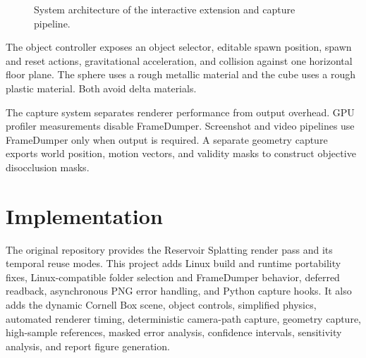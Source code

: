 \documentclass[10pt,twocolumn]{article}
\begin{document}
\begin{figure}[t]
\centering
{}
\caption{System architecture of the interactive extension and capture
pipeline.}
\label{fig:architecture}
\end{figure}

The object controller exposes an object selector, editable spawn position,
spawn and reset actions, gravitational acceleration, and collision against one
horizontal floor plane. The sphere uses a rough metallic material and the cube
uses a rough plastic material. Both avoid delta materials.

The capture system separates renderer performance from output overhead. GPU
profiler measurements disable FrameDumper. Screenshot and video pipelines use
FrameDumper only when output is required. A separate geometry capture exports
world position, motion vectors, and validity masks to construct objective
disocclusion masks.

\section{Implementation}

The original repository provides the Reservoir Splatting render pass and its
temporal reuse modes. This project adds Linux build and runtime portability
fixes, Linux-compatible folder selection and FrameDumper behavior, deferred
readback, asynchronous PNG error handling, and Python capture hooks. It also
adds the dynamic Cornell Box scene, object controls, simplified physics,
automated renderer timing, deterministic camera-path capture, geometry
capture, high-sample references, masked error analysis, confidence intervals,
sensitivity analysis, and report figure generation.
\end{document}
